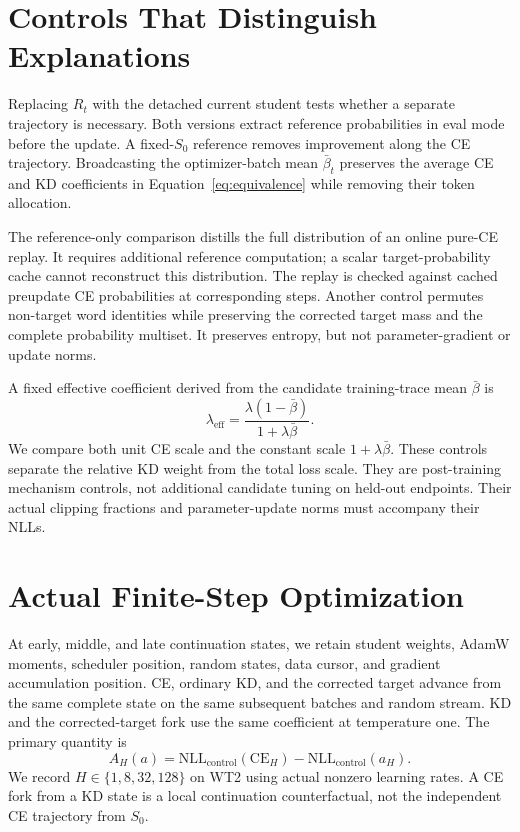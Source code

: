 \documentclass[11pt]{article}
\begin{document}
\section{Controls That Distinguish Explanations}
Replacing $R_t$ with the detached current student tests whether a separate
trajectory is necessary. Both versions extract reference probabilities in
eval mode before the update. A fixed-$S_0$ reference removes improvement
along the CE trajectory. Broadcasting the optimizer-batch mean
$\bar\beta_t$ preserves the average CE and KD coefficients in
Equation~\ref{eq:equivalence} while removing their token allocation.

The reference-only comparison distills the full distribution of an online
pure-CE replay. It requires additional reference computation; a scalar
target-probability cache cannot reconstruct this distribution. The replay
is checked against cached preupdate CE probabilities at corresponding
steps. Another control permutes non-target word identities while preserving
the corrected target mass and the complete probability multiset. It
preserves entropy, but not parameter-gradient or update norms.

A fixed effective coefficient derived from the candidate training-trace
mean $\bar\beta$ is
\begin{equation}
 \lambda_{\mathrm{eff}}=
 \frac{\lambda(1-\bar\beta)}{1+\lambda\bar\beta}.
\end{equation}
We compare both unit CE scale and the constant scale
$1+\lambda\bar\beta$. These controls separate the relative KD weight
from the total loss scale. They are post-training mechanism controls,
not additional candidate tuning on held-out endpoints. Their actual
clipping fractions and parameter-update norms must accompany their NLLs.

\section{Actual Finite-Step Optimization}
At early, middle, and late continuation states, we retain student weights,
AdamW moments, scheduler position, random states, data cursor, and gradient
accumulation position. CE, ordinary KD, and the corrected target advance
from the same complete state on the same subsequent batches and random
stream. KD and the corrected-target fork use the same coefficient at
temperature one. The primary quantity is
\begin{equation}
 A_H(a)=\mathrm{NLL}_{\mathrm{control}}(\mathrm{CE}_H)
       -\mathrm{NLL}_{\mathrm{control}}(a_H).
\end{equation}
We record $H\in\{1,8,32,128\}$ on WT2 using actual nonzero learning
rates. A CE fork from a KD state is a local continuation counterfactual,
not the independent CE trajectory from $S_0$.
\end{document}

